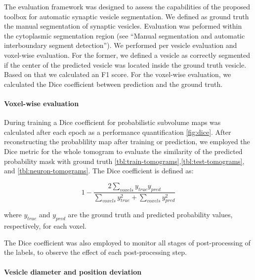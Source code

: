 The evaluation framework was designed to assess the capabilities of the proposed toolbox for automatic synaptic vesicle segmentation.
We defined as ground truth the manual segmentation of synaptic vesicles.
Evaluation was peformed within the cytoplasmic segmentation region (see ``Manual segmentation and automatic interboundary segment detection'').
We performed per vesicle evaluation and voxel-wise evaluation.
For the former, we defined a vesicle as correctly segmented if the center of the predicted vesicle was located inside the ground truth vesicle.
Based on that we calculated an F1 score.
For the voxel-wise evaluation, we calculated the Dice coefficient between prediction and the ground truth.

\hypertarget{voxel-wise-evaluation}{%
\paragraph{Voxel-wise evaluation}\label{voxel-wise-evaluation}}

During training a Dice coefficient for probabilistic subvolume maps was calculated after each epoch as a performance quantification \ref{fig:dice}.
After reconstructing the probablility map after training or prediction, we employed the Dice metric for the whole tomogram to evaluate the similarity of the predicted probability mask with ground truth \ref{tbl:train-tomograms},\ref{tbl:test-tomograms}, and \ref{tbl:neuron-tomograms}.
The Dice coefficient is defined as:

\begin{equation}1-\frac{2\sum_{voxels} y_{true} y_{pred}}{\sum_{voxels} y_{true}^2+\sum_{voxels} y_{pred}^2}\label{eq:dice}\end{equation}

where \(y_{true}\) and \(y_{pred}\) are the ground truth and predicted probability values, respectively, for each voxel.

The Dice coefficient was also employed to monitor all stages of post-processing of the labels, to observe the effect of each post-processing step.

\hypertarget{vesicle-diameter-and-position-deviation}{%
\paragraph{Vesicle diameter and position deviation}\label{vesicle-diameter-and-position-deviation}}

